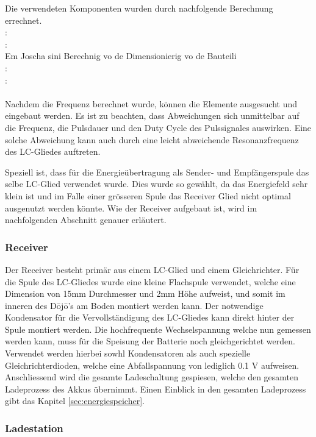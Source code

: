 Die verwendeten Komponenten wurden durch nachfolgende Berechnung errechnet.
 \\
: \\
: \\
Em Joscha sini Berechnig vo de Dimensionierig vo de Bauteili
 \\
: \\
: \\
 \\

Nachdem die Frequenz berechnet wurde, können die Elemente ausgesucht und eingebaut werden. Es ist zu beachten, dass Abweichungen sich unmittelbar auf die Frequenz, die Pulsdauer und den Duty Cycle des Pulssignales auswirken. Eine solche Abweichung kann auch durch eine leicht abweichende Resonanzfrequenz des LC-Gliedes auftreten.
 
Speziell ist, dass für die Energieübertragung als Sender- und Empfängerspule das selbe LC-Glied verwendet wurde. Dies wurde so gewählt, da das Energiefeld sehr klein ist und im Falle einer grösseren Spule das Receiver Glied nicht optimal ausgenutzt werden könnte. Wie der Receiver aufgebaut ist, wird im nachfolgenden Abschnitt genauer erläutert.

\subsubsection*{Receiver}
Der Receiver besteht primär aus einem LC-Glied und einem Gleichrichter. Für die Spule des LC-Gliedes wurde eine kleine Flachspule verwendet, welche eine Dimension von 15mm Durchmesser und 2mm Höhe aufweist, und somit im inneren des Dōjō’s am Boden montiert werden kann. Der notwendige Kondensator für die Vervollständigung des LC-Gliedes kann direkt hinter der Spule montiert werden. Die hochfrequente Wechselspannung welche nun gemessen werden kann, muss für die Speisung der Batterie noch gleichgerichtet werden. Verwendet werden hierbei sowhl Kondensatoren als auch spezielle Gleichrichterdioden, welche eine Abfallspannung von lediglich 0.1 V aufweisen. Anschliessend wird die gesamte Ladeschaltung gespiesen, welche den gesamten Ladeprozess des Akkus übernimmt. Einen Einblick in den gesamten Ladeprozess gibt das Kapitel \ref{sec:energiespeicher}.


\subsubsection*{Ladestation}

